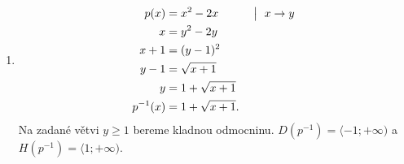 \documentclass[11pt,a4paper]{article}
\begin{document}
\begin{zadaniReseniBox}[title={Domácí úkol}]
\begin{enumerate}[label=\alph*)]
\[\begin{aligned}
x&=2y-4\\
2y&=x+4\\
y&=\frac{x+4}{2}\\
k^{-1}(x)&=\frac{x+4}{2}.
\end{aligned}
\]
Z podmínky $y\ge2$ plyne $|2y-4|=2y-4$. $D(k^{-1})=\langle0;+\infty)$, $H(k^{-1})=\langle2;+\infty)$.
\item
\[
\begin{aligned}
p(x)&=x^2-2x &&\bigm|\ x\to y\\
x&=y^2-2y\\
x+1&=(y-1)^2\\
y-1&=\sqrt{x+1}\\
y&=1+\sqrt{x+1}\\
p^{-1}(x)&=1+\sqrt{x+1}.
\end{aligned}
\]
Na zadané větvi $y\ge1$ bereme kladnou odmocninu. $D(p^{-1})=\langle-1;+\infty)$ a $H(p^{-1})=\langle1;+\infty)$.
\end{enumerate}
\end{zadaniReseniBox}
\end{document}
